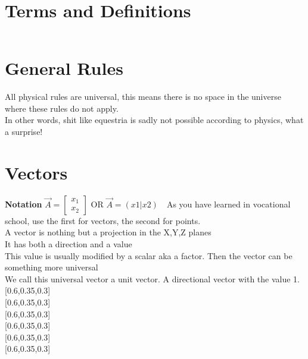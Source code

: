 \documentclass[main.tex,fontsize=8pt,paper=a4,paper=portrait,DIV=calc,]{scrartcl}
\begin{document}
\section{Terms and Definitions}
\begin{table}[h!]
\begin{tabular}{|p{0.2\linewidth}|p{0.755\linewidth}|}
\hline

\hline
\hline
\hline
\end{tabular}
\end{table}
\section{General Rules}
All physical rules are universal, this means there is no space in the universe where these rules do not apply. \\ In other words, shit like equestria is sadly not possible according to physics, what a surprise!
\section{Vectors}
\textbf{Notation} \( \vec{A} = \begin{bmatrix}x_{1} \\ x_{2} \end{bmatrix} \) OR \(\vec{A} = (x1 | x2)\)
\,   \,As you have learned in vocational school, use the first for vectors, the second for points.\\
{A vector is nothing but a projection in the X,Y,Z planes \\ 
It has both a direction and a value\\
This value is usually modified by a scalar aka a factor. Then the vector can be something more universal \\
We call this universal vector a unit vector. A directional vector with the value 1.}[0.6,0.35,0.3]\\
[0.6,0.35,0.3]\\
[0.6,0.35,0.3]\\
[0.6,0.35,0.3]\\
[0.6,0.35,0.3]\\
[0.6,0.35,0.3]\\
\end{document}
